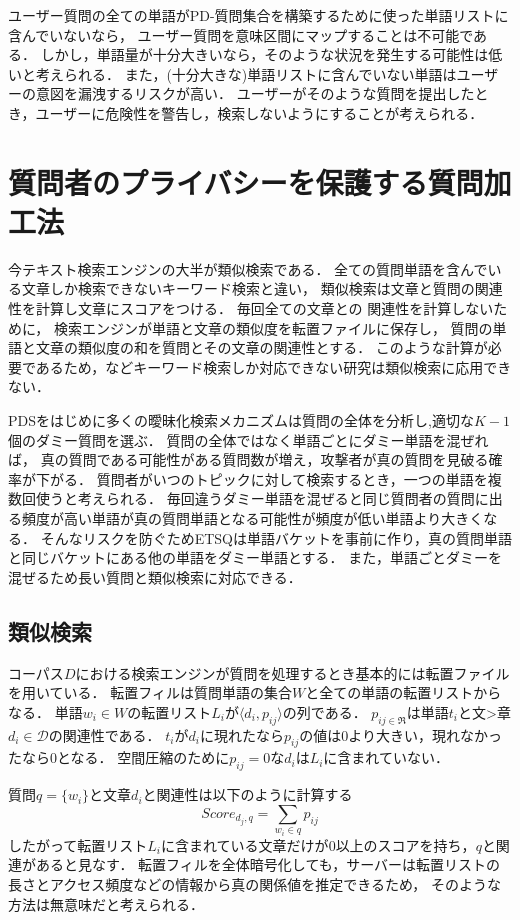 \documentclass[master]{suribt}
\theoremstyle{definition}
\begin{document}
 ユーザー質問の全ての単語がPD-質問集合を構築するために使った単語リストに含んでいないなら，
 ユーザー質問を意味区間にマップすることは不可能である．
 しかし，単語量が十分大きいなら，そのような状況を発生する可能性は低いと考えられる．
 また，(十分大きな)単語リストに含んでいない単語はユーザーの意図を漏洩するリスクが高い．
 ユーザーがそのような質問を提出したとき，ユーザーに危険性を警告し，検索しないようにすることが考えられる．

 \section{質問者のプライバシーを保護する質問加工法} \label{s:ETSQ}
 今テキスト検索エンジンの大半が類似検索である．
 全ての質問単語を含んでいる文章しか検索できないキーワード検索と違い，
 類似検索は文章と質問の関連性を計算し文章にスコアをつける\cite{if2006}．
 毎回全ての文章との 関連性を計算しないために，
 検索エンジンが単語と文章の類似度を転置ファイルに保存し，
 質問の単語と文章の類似度の和を質問とその文章の関連性とする．
 このような計算が必要であるため，\cite{pss2006,opf2005,pke2004,soe2000}などキーワード検索しか対応できない研究は類似検索に応用できない．

 PDSをはじめに多くの曖昧化検索メカニズム\cite{masking2014,praw2005,goo2009}は質問の全体を分析し,適切な$K−1$個のダミー質問を選ぶ．
 質問の全体ではなく単語ごとにダミー単語を混ぜれば，
 真の質問である可能性がある質問数が増え，攻撃者が真の質問を見破る確率が下がる．
 質問者がいつのトピックに対して検索するとき，一つの単語を複数回使うと考えられる．
 毎回違うダミー単語を混ぜると同じ質問者の質問に出る頻度が高い単語が真の質問単語となる可能性が頻度が低い単語より大きくなる．
 そんなリスクを防ぐためETSQは単語バケットを事前に作り，真の質問単語と同じバケットにある他の単語をダミー単語とする．
 また，単語ごとダミーを混ぜるため長い質問と類似検索に対応できる．

 \subsection{類似検索}
 コーパス$D$における検索エンジンが質問を処理するとき基本的には転置ファイルを用いている．
 転置フィルは質問単語の集合$W$と全ての単語の転置リストからなる．
 単語$w_i \in W$の転置リスト$L_i$が$\langle d_i,p_{ij}\rangle$の列である．
 $p_{ij \in \Re}$は単語$t_i$と文>章$d_i \in \mathcal{D}$の関連性である．
 $t_i$が$d_i$に現れたなら$p_{ij}$の値は$0$より大きい，現れなかったなら$0$となる．
 空間圧縮のために$p_{ij}=0$な$d_i$は$L_i$に含まれていない．

 質問$q=\{w_i\}$と文章$d_i$と関連性は以下のように計算する
 \begin{equation}
 Score_{d_j,q} = \sum_{w_i \in q}p_{ij}
 \end{equation}
 したがって転置リスト$L_i$に含まれている文章だけが$0$以上のスコアを持ち，$q$と関連があると見なす．
 転置フィルを全体暗号化しても，サーバーは転置リストの長さとアクセス頻度などの情報から真の関係値を推定できるため，
 そのような方法は無意味だと考えられる．
 
\end{document}
